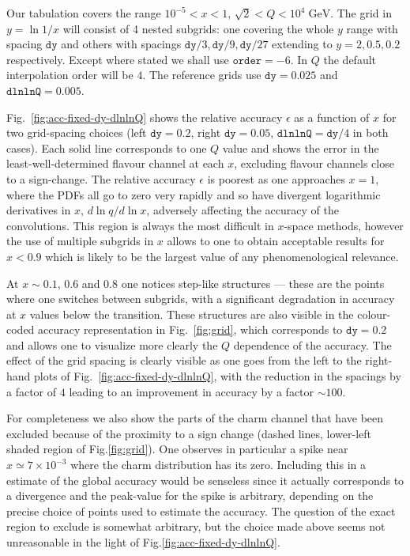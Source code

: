 \documentclass[12pt]{article}
\newcommand{\dy}{\ttt{dy}}
\newcommand{\dlnlnQ}{\ttt{dlnlnQ}}
\newcommand{\GeV}{\;\mathrm{GeV}}
\newcommand{\ttt}[1]{\texttt{#1}}
\begin{document}
Our tabulation covers the range $10^{-5}<x<1$, $\sqrt{2} < Q<
10^4\GeV$. The grid in $y=\ln1/x$ will consist of 4 nested subgrids:
one covering the whole $y$ range with spacing $\ttt{dy}$ and others
with spacings $\ttt{dy}/3, \ttt{dy}/9, \ttt{dy}/27$ extending to
$y=2,0.5,0.2$ respectively. Except where stated we shall use
$\ttt{order}=-6$. In $Q$ the default interpolation order will be $4$.
The reference grids use $\dy=0.025$ and $\dlnlnQ=0.005$.

Fig.~\ref{fig:acc-fixed-dy-dlnlnQ} shows the relative accuracy
$\epsilon$ as a function of $x$ for two grid-spacing choices (left
$\dy=0.2$, right $\dy=0.05$, $\dlnlnQ=\dy/4$ in both cases). Each
solid line corresponds to one $Q$ value and shows the error in the
least-well-determined flavour channel at each $x$, excluding flavour
channels close to a sign-change. The relative accuracy $\epsilon$
is poorest as
one approaches $x=1$, where the PDFs all go to zero very rapidly and
so have divergent logarithmic derivatives in $x$, $d\ln q/d\ln x$,
adversely affecting the accuracy of the convolutions. This region is
always the most difficult in $x$-space methods, however the use of
multiple subgrids in $x$ allows to one to obtain acceptable results
for $x<0.9$ which is likely to be the largest value of any
phenomenological relevance. 

At $x\sim0.1$, $0.6$ and $0.8$ one notices
step-like structures --- these are the points where one switches
between subgrids, with a significant degradation in accuracy at $x$
values below the transition. These structures are also visible in the
colour-coded accuracy representation in Fig.~\ref{fig:grid}, which
corresponds to $\dy=0.2$ and allows one to visualize more clearly the
$Q$ dependence of the accuracy. The effect of the grid spacing is
clearly visible as one goes from the left to the right-hand plots of
Fig.~\ref{fig:acc-fixed-dy-dlnlnQ},
with the reduction in the spacings by a factor of $4$ leading to an
improvement in accuracy by a factor $\sim 100$.



For completeness we also show the parts of the charm channel that have
been excluded because of the proximity to a sign change (dashed lines,
lower-left shaded region of Fig.\ref{fig:grid}).  One observes in
particular a spike near $x\simeq 7 \times 10^{-3}$ where the charm
distribution has its zero. Including this in a estimate of the global
accuracy would be senseless since it actually corresponds to a
divergence and the peak-value for the spike is arbitrary, depending on
the precise choice of points used to estimate the accuracy. The
question of the exact region to exclude is somewhat arbitrary, but the
choice made above seems not unreasonable in the light of
Fig.\ref{fig:acc-fixed-dy-dlnlnQ}.
\end{document}
